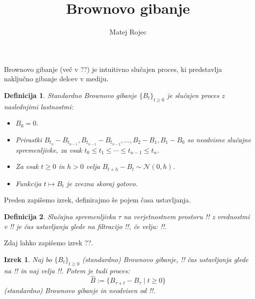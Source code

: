 \documentclass[11pt]{article}
\newtheorem{izrek}{Izrek}
\newtheorem{definicija}{Definicija}
\begin{document}
\title{Brownovo gibanje}
\author{Matej Rojec}
\maketitle


Brownovo gibanje (več v ??) je intuitivno slučajen proces, %
ki predstavlja naključno gibanje delcev v mediju.
    

\begin{definicija}
    Standardno Brownovo gibanje \(\{B_t\}_{t \geq 0}\) je slučajen proces z naslednjimi lastnostmi: 
    \begin{itemize}
        \item\(B_0 = 0\).
        \item Prirastki \(B_{t_n} - B_{t_{n-1}}, B_{t_{n-1}} - B_{t_{n-2}}, \ldots, B_2 - B_1, B_1 - B_0\) so neodvisne slučajne spremenljivke, za vsak \(t_0 \leq t_1 \leq \cdots \leq t_{n-1} \leq t_n\).
        \item Za vsak \(t \geq 0\) in \(h > 0\) velja \(B_{t+h} - B_t \sim \mathcal{N}(0, h)\).
        \item Funkcija \(t \mapsto B_t\) je zvezna skoraj gotovo.
    \end{itemize}
\end{definicija}
    
    Preden zapišemo izrek, definirajmo še pojem časa ustavljanja.
    
\begin{definicija}
    Slučajna spremenljivka \(\tau\) na verjetnostnem prostoru !! z vrednostmi v !!
    je čas ustavljanja glede na filtracijo !!, če velja: !!.
\end{definicija}
    Zdaj lahko zapišemo izrek ??. %
    
\begin{izrek}
    Naj bo \(\{B_t\}_{t \geq 0}\) (standardno) Brownovo gibanje, !! čas ustavljanja glede na 
    !! in naj velja !!.
    Potem je tudi proces:
    \[
    \hat{B} := \{B_{\tau+t} - B_\tau \mid t \geq 0\}
    \]
    (standardno) Brownovo gibanje in neodvisen od !!.
\end{izrek}
\end{document}
